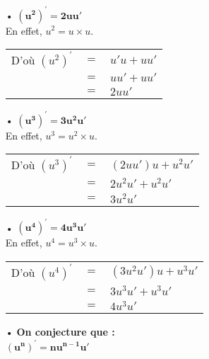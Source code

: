 \begin{itemize}
\item[•] $\mathbf{\left(u^2\right)^{'} = 2uu'}$ \\

En effet, $u^2 = u \times u$. \\

\begin{tabular}{lll}
D'où $\left(u^2\right)^{'}$ & $ = $ & $ u'u + uu' $ \\
& $=$ & $uu' + uu'$ \\
& $=$ & $2uu'$ \\
\end{tabular}

\vspace*{.3cm}

\item[•] $\mathbf{\left(u^3\right)^{'} = 3u^2u'}$ \\

En effet, $u^3 = u^2 \times u$. \\

\begin{tabular}{lll}
D'où $\left(u^3\right)^{'}$ & $ = $ & $ \left(2uu'\right)u + u^2u' $ \\
& $=$ & $2u^2u' + u^2u'$ \\
& $=$ & $3u^2u'$ \\
\end{tabular}

\vspace*{.3cm}

\item[•] $\mathbf{\left(u^4\right)^{'} = 4u^3u'}$ \\

En effet, $u^4 = u^3 \times u$. \\

\begin{tabular}{lll}
D'où $\left(u^4\right)^{'}$ & $ = $ & $ \left(3u^2u'\right)u + u^3u' $ \\
& $=$ & $3u^3u' + u^3u'$ \\
& $=$ & $4u^3u'$ \\
\end{tabular}

\vspace*{.3cm}

\item[•] \textbf{On conjecture que :} \\

$\mathbf{\left(u^n\right)^{'} = nu^{n-1}u'}$
\end{itemize}


